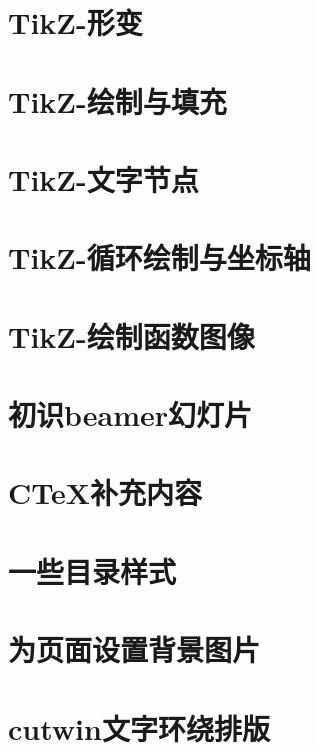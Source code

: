 \documentclass[12pt,a4paper]{ctexart}  %
\begin{document}
\section{TikZ-形变}
\section{TikZ-绘制与填充}
\section{TikZ-文字节点}
\section{TikZ-循环绘制与坐标轴}
\section{TikZ-绘制函数图像}
\section{初识beamer幻灯片}
\section{CTeX补充内容}
\section{一些目录样式}
\section{为页面设置背景图片}
\section{cutwin文字环绕排版}
\end{document}

